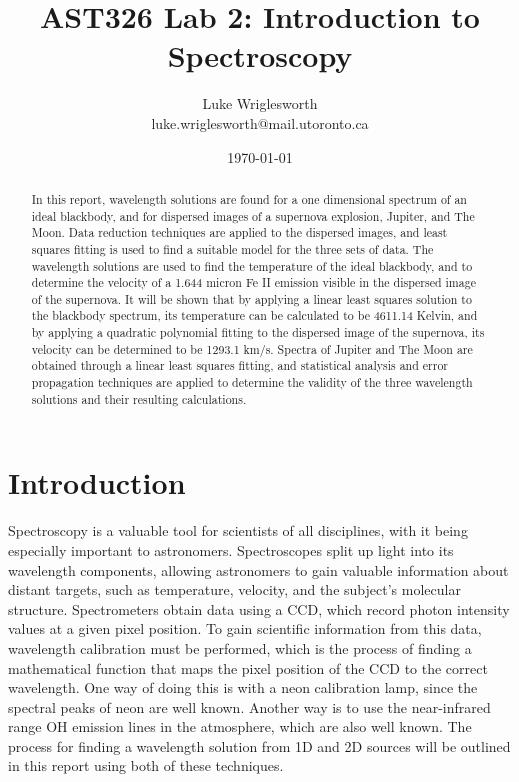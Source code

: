 \documentclass{article}
\title{AST326 Lab 2: Introduction to Spectroscopy}
\author{Luke Wriglesworth \\ \small luke.wriglesworth@mail.utoronto.ca}
\date{\today}
\begin{document}
\maketitle

\begin{abstract}
  In this report, wavelength solutions are found for a one dimensional spectrum of an ideal blackbody, and for dispersed images of a supernova explosion, Jupiter, and The Moon. Data reduction techniques are applied to the dispersed images, and least squares fitting is used 
  to find a suitable model for the three sets of data. The wavelength solutions are used to find the temperature of the ideal blackbody, and to determine the velocity of a 1.644 micron Fe II emission visible in the dispersed image of the supernova. It will be shown that by 
  applying a linear least squares solution to the blackbody spectrum, its temperature can be calculated to be 4611.14 Kelvin, and by applying a quadratic polynomial fitting to the dispersed image of the supernova, its velocity can be determined to be 1293.1 km/s.
  Spectra of Jupiter and The Moon are obtained through a linear least squares fitting, and statistical analysis and error propagation techniques are applied to determine the validity of the three wavelength solutions and their resulting calculations. 
\end{abstract}


\section{Introduction}

Spectroscopy is a valuable tool for scientists of all disciplines, with it being especially important to astronomers. Spectroscopes split up light 
into its wavelength components, allowing astronomers to gain valuable information about distant targets, such as temperature, velocity, and the subject's molecular structure. 
Spectrometers obtain data using a CCD, which record photon intensity values at a given pixel position. To gain scientific information from this data, wavelength calibration must be performed, which is the process of finding a mathematical function that maps the pixel position of the CCD to the correct wavelength. One way of doing this is with a 
neon calibration lamp, since the spectral peaks of neon are well known. Another way is to use the near-infrared range OH emission lines in the atmosphere, which are also well known. 
The process for finding a wavelength solution from 1D and 2D sources will be outlined in this report using both of these techniques. 
\end{document}
